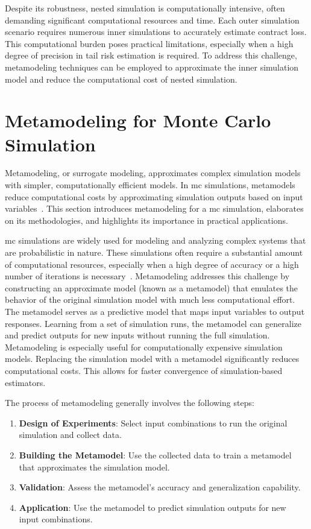 Despite its robustness, nested simulation is computationally intensive, often demanding significant computational resources and time.
Each outer simulation scenario requires numerous inner simulations to accurately estimate contract loss.
This computational burden poses practical limitations, especially when a high degree of precision in tail risk estimation is required.
To address this challenge, metamodeling techniques can be employed to approximate the inner simulation model and reduce the computational cost of nested simulation.

\section{Metamodeling for Monte Carlo Simulation}

Metamodeling, or surrogate modeling, approximates complex simulation models with simpler, computationally efficient models.
In \gls{mc} simulations, metamodels reduce computational costs by approximating simulation outputs based on input variables~\citep{kleijnen2018design}.
This section introduces metamodeling for a \gls{mc} simulation, elaborates on its methodologies, and highlights its importance in practical applications.

\gls{mc} simulations are widely used for modeling and analyzing complex systems that are probabilistic in nature.
These simulations often require a substantial amount of computational resources, especially when a high degree of accuracy or a high number of iterations is necessary~\citep{glasserman2004monte}.
Metamodeling addresses this challenge by constructing an approximate model (known as a metamodel) that emulates the behavior of the original simulation model with much less computational effort.
The metamodel serves as a predictive model that maps input variables to output responses.
Learning from a set of simulation runs, the metamodel can generalize and predict outputs for new inputs without running the full simulation.
Metamodeling is especially useful for computationally expensive simulation models.
Replacing the simulation model with a metamodel significantly reduces computational costs.
This allows for faster convergence of simulation-based estimators.

The process of metamodeling generally involves the following steps:

\begin{enumerate} 
    \item \textbf{Design of Experiments}: Select input combinations to run the original simulation and collect data.
    \item \textbf{Building the Metamodel}: Use the collected data to train a metamodel that approximates the simulation model.
    \item \textbf{Validation}: Assess the metamodel's accuracy and generalization capability.
    \item \textbf{Application}: Use the metamodel to predict simulation outputs for new input combinations.
\end{enumerate}

